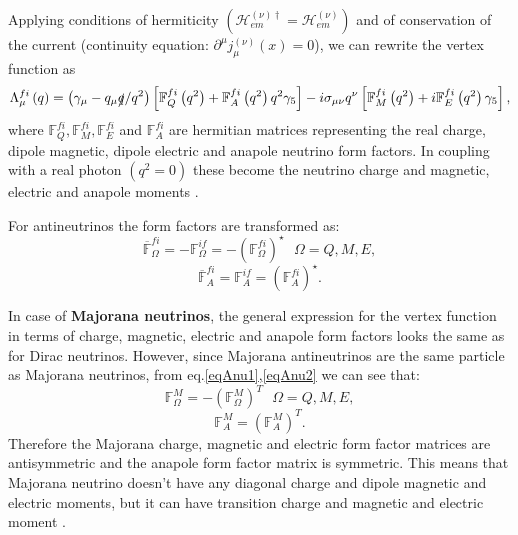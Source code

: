Applying conditions of hermiticity $\left(\mathcal{H}^{\left(\nu\right)\dagger}_{em}=\mathcal{H}^{\left(\nu\right)}_{em}\right)$ and of conservation of the current (continuity equation: 
$\partial^{\mu}j^{\left(\nu\right)}_{\mu}\left(x\right)=0$), we can rewrite the vertex function as
\begin{equation}
\Lambda^{fi}_{\mu}\left(q\right)=
\left(\gamma_{\mu}-q_{\mu}\slashed{q}/q^2\right)\left[
\mathbb{F}^{fi}_{Q}\left(q^2\right)+\mathbb{F}^{fi}_{A}\left(q^2\right)q^2\gamma_5\right]-
i\sigma_{\mu\nu}q^{\nu}\left[\mathbb{F}^{fi}_{M}\left(q^2\right)+i\mathbb{F}^{fi}_{E}\left(q^2\right)\gamma_5\right],
\end{equation}
where $\mathbb{F}^{fi}_Q,\mathbb{F}^{fi}_M,\mathbb{F}^{fi}_E$ and $\mathbb{F}^{fi}_A$ are hermitian matrices representing the real charge, dipole magnetic, dipole electric and anapole neutrino form factors. In coupling with a real photon $\left(q^2=0\right)$ these become the neutrino charge and magnetic, electric and anapole moments \cite{nuElmagInt2015.pdf}.

For antineutrinos the form factors are transformed as:
\begin{equation}\label{eqAnu1}
\overline{\mathbb{F}}^{fi}_{\Omega}=-\mathbb{F}^{if}_{\Omega}=-\left(\mathbb{F}^{fi}_{\Omega}\right)^{\star} \ \ \ \Omega=Q,M,E,
\end{equation}
\begin{equation}\label{eqAnu2}
\overline{\mathbb{F}}^{fi}_{A}=\mathbb{F}^{if}_{A}=\left(\mathbb{F}^{fi}_{A}\right)^{\star}.
\end{equation}

In case of \textbf{Majorana neutrinos}, the general expression for the vertex function in terms of charge, magnetic, electric and anapole form factors looks the same as for Dirac neutrinos.
 However, since Majorana antineutrinos are the same particle as Majorana neutrinos, from eq.\ref{eqAnu1},\ref{eqAnu2} we can see that:
\begin{equation}\label{eqAntisymmetryCondition}
\mathbb{F}^M_{\Omega}=-\left(\mathbb{F}^M_{\Omega}\right)^T \ \ \ \Omega=Q,M,E,
\end{equation}
\begin{equation}
\mathbb{F}^M_{A}=\left(\mathbb{F}^M_A\right)^T.
\end{equation}
Therefore the Majorana charge, magnetic and electric form factor matrices are antisymmetric and the anapole form factor matrix is symmetric. This means that Majorana neutrino doesn't have any diagonal charge and dipole magnetic and electric moments, but it can have transition  charge and magnetic and electric moment \cite{nuElmagInt2015.pdf}.

